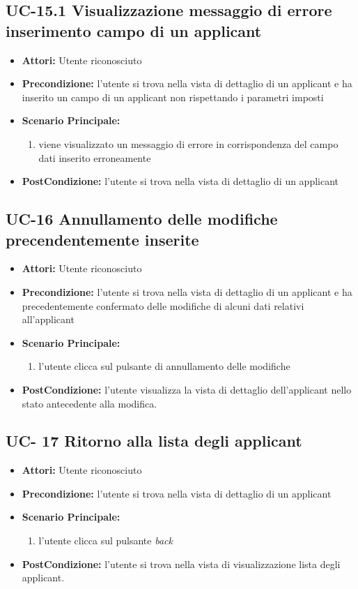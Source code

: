\subsection{UC-15.1 Visualizzazione messaggio di errore inserimento campo di un applicant}
\begin{itemize}
\item \textbf{Attori:} Utente riconosciuto
\item \textbf{Precondizione:}  l'utente si trova nella vista di dettaglio di un applicant e ha inserito un campo di un  applicant non rispettando i parametri imposti
\item \textbf{Scenario Principale:}
\begin{enumerate}
	\item viene visualizzato un messaggio di errore in corrispondenza del campo dati inserito erroneamente
\end{enumerate}
\item \textbf{PostCondizione:}  l'utente si trova nella vista di dettaglio di un applicant
\end{itemize}




\subsection{UC-16 Annullamento delle modifiche precendentemente inserite}
\begin{itemize}
\item \textbf{Attori:} Utente riconosciuto
\item \textbf{Precondizione:} l'utente si trova nella vista di dettaglio di un applicant e ha precedentemente confermato delle modifiche di alcuni dati relativi all'applicant
\item \textbf{Scenario Principale:}
\begin{enumerate}
	\item l'utente clicca sul pulsante di annullamento delle modifiche
\end{enumerate}
\item \textbf{PostCondizione:} l'utente visualizza la vista di dettaglio dell'applicant nello stato antecedente alla modifica.
\end{itemize}

\subsection{UC- 17 Ritorno alla lista degli applicant }
\begin{itemize}
\item \textbf{Attori:} Utente riconosciuto
\item \textbf{Precondizione:} l'utente si trova nella vista di dettaglio di un applicant
\item \textbf{Scenario Principale:}
\begin{enumerate}
	\item l'utente clicca sul pulsante \textit{back}
\end{enumerate}
\item \textbf{PostCondizione:} l'utente si trova nella vista di visualizzazione lista degli applicant.
\end{itemize}

